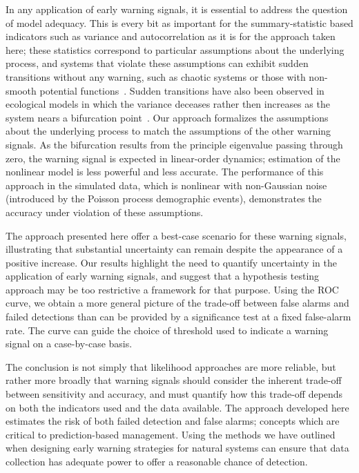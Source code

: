 \documentclass{pnastwo}
\begin{document}
\begin{article}
In any application of early warning signals, it is essential to address the question of model adequacy.  
This is every bit as important for the summary-statistic based indicators such as variance and autocorrelation
as it is for the approach taken here; these statistics correspond to particular assumptions about the underlying process,
and systems that violate these assumptions can exhibit sudden transitions without any warning,
such as chaotic systems or those with non-smooth potential functions~\cite{Hastings2010}.
Sudden transitions have also been observed in ecological models in which 
the variance deceases rather then increases as the system nears a bifurcation point~\cite{Schreiber2003, Schreiber2008}.  
Our approach formalizes the assumptions about the underlying process to match the assumptions of the other warning signals.  
As the bifurcation results from the principle eigenvalue passing through zero, 
the warning signal is expected in linear-order dynamics;
estimation of the nonlinear model is less powerful and less accurate.  
The performance of this approach in the simulated data, which is nonlinear with non-Gaussian noise 
(introduced by the Poisson process demographic events), 
demonstrates the accuracy under violation of these assumptions.  


The approach presented here offer a best-case scenario for these warning signals,
illustrating that substantial uncertainty can remain despite the appearance of a positive increase.
Our results highlight the need to quantify uncertainty in the application of early warning signals,
and suggest that a hypothesis testing approach may be too restrictive a framework for that purpose.
Using the ROC curve, we obtain a more general picture of the trade-off between false alarms and failed detections
than can be provided by a significance test at a fixed false-alarm rate.  
The curve can guide the choice of threshold used to indicate a warning signal on a case-by-case basis.  


The conclusion is not simply that likelihood approaches are more reliable, 
but rather more broadly that warning signals should consider
the inherent trade-off between sensitivity and accuracy,
and must quantify how this trade-off depends on both the indicators used and the data available.  
The approach developed here estimates the risk of both failed detection and false alarms;
concepts which are critical to prediction-based management.  
Using the methods we have outlined when designing early warning strategies for natural systems
can ensure that data collection has adequate power to offer a reasonable chance of detection. 


\end{article}
\end{document}
